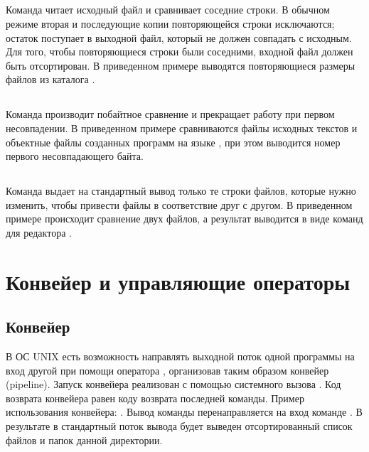 \vspace{-1em}
\subsection{}

Команда  читает исходный файл и сравнивает соседние строки. В обычном режиме вторая и последующие копии повторяющейся строки исключаются; остаток поступает в выходной файл, который не должен совпадать с исходным. Для того, чтобы повторяющиеся строки были соседними, входной файл должен быть отсортирован. В приведенном примере выводятся повторяющиеся размеры файлов из каталога . 


\vspace{-1em}
\subsection{}

Команда  производит побайтное сравнение и прекращает работу при первом несовпадении. В приведенном примере сравниваются файлы исходных текстов и объектные файлы созданных программ на языке , при этом выводится номер первого несовпадающего байта.


\subsection{}

Команда  выдает на стандартный вывод только те строки файлов, которые нужно изменить, чтобы привести файлы в соответствие друг с другом. В приведенном примере происходит сравнение двух файлов, а результат выводится в виде команд для редактора .


\section{Конвейер и управляющие операторы}

\subsection{Конвейер}

В ОС UNIX есть возможность направлять выходной поток одной программы на вход другой при помощи оператора \code{|}, организовав таким образом конвейер (pipeline). Запуск конвейера реализован с помощью системного вызова . Код возврата конвейера равен коду возврата последней команды. Пример использования конвейера: . Вывод команды  перенаправляется на вход команде . В результате в стандартный поток вывода будет выведен отсортированный список файлов и папок данной директории.

